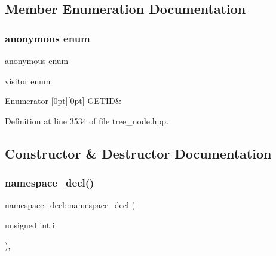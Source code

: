 \subsection{Member Enumeration Documentation}
\mbox{\label{structnamespace__decl_a6223f4fe9ccf39dcbee7766409afaab9}} 
\subsubsection{\texorpdfstring{anonymous enum}{anonymous enum}}
{\footnotesize\ttfamily anonymous enum}



visitor enum 

\begin{DoxyEnumFields}{Enumerator}
[0pt][0pt]{}\mbox{\label{structnamespace__decl_a6223f4fe9ccf39dcbee7766409afaab9a1aa659db592d7d6da38ac30d21a5c133}} 
G\+E\+T\+ID&\\
\hline

\end{DoxyEnumFields}


Definition at line 3534 of file tree\+\_\+node.\+hpp.



\subsection{Constructor \& Destructor Documentation}
\mbox{\label{structnamespace__decl_ab1bcc7f23f7d9c1e1831e1d453498399}} 
\subsubsection{\texorpdfstring{namespace\+\_\+decl()}{namespace\_decl()}}
{\footnotesize\ttfamily namespace\+\_\+decl\+::namespace\+\_\+decl (\begin{DoxyParamCaption}\item[{unsigned int}]{i }\end{DoxyParamCaption})\hspace{0.3cm}{\ttfamily [inline]}, {\ttfamily [explicit]}}



